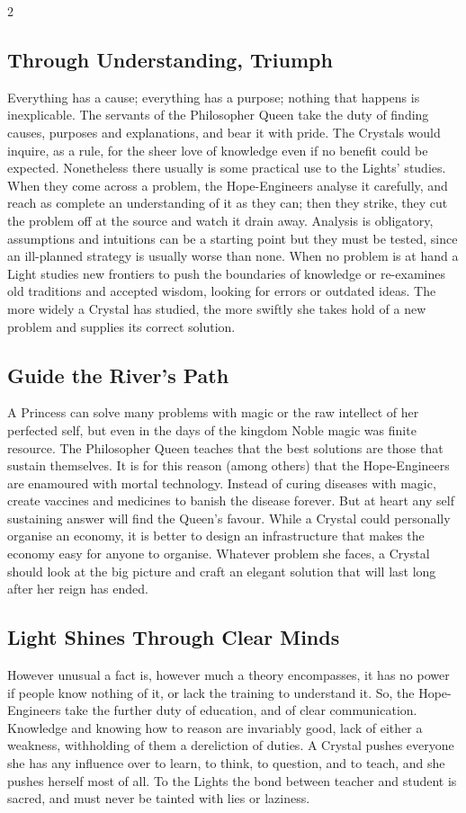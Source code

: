 \begin{multicols}{2}
\subsection*{Through Understanding, Triumph}
Everything has a cause; everything has a purpose; nothing that happens is inexplicable. The servants of the Philosopher Queen take the duty of finding causes, purposes and explanations, and bear it with pride. The Crystals would inquire, as a rule, for the sheer love of knowledge even if no benefit could be expected. Nonetheless there usually is some practical use to the Lights' studies. When they come across a problem, the Hope-Engineers analyse it carefully, and reach as complete an understanding of it as they can; then they strike, they cut the problem off at the source and watch it drain away. Analysis is obligatory, assumptions and intuitions can be a starting point but they must be tested, since an ill-planned strategy is usually worse than none. When no problem is at hand a Light studies new frontiers to push the boundaries of knowledge or re-examines old traditions and accepted wisdom, looking for errors or outdated ideas. The more widely a Crystal has studied, the more swiftly she takes hold of a new 
problem and supplies its correct solution.

\subsection*{Guide the River's Path}
A Princess can solve many problems with magic or the raw intellect of her perfected self, but even in the days of the kingdom Noble magic was finite resource. The Philosopher Queen teaches that the best solutions are those that sustain themselves. It is for this reason (among others) that the Hope-Engineers are enamoured with mortal technology. Instead of curing diseases with magic, create vaccines and medicines to banish the disease forever. But at heart any self sustaining answer will find the Queen's favour. While a Crystal could personally organise an economy, it is better to design an infrastructure that makes the economy easy for anyone to organise. Whatever problem she faces, a Crystal should look at the big picture and craft an elegant solution that will last long after her reign has ended.

\subsection*{Light Shines Through Clear Minds}
However unusual a fact is, however much a theory encompasses, it has no power if people know nothing of it, or lack the training to understand it. So, the Hope-Engineers take the further duty of education, and of clear communication. Knowledge and knowing how to reason are invariably good, lack of either a weakness, withholding of them a dereliction of duties. A Crystal pushes everyone she has any influence over to learn, to think, to question, and to teach, and she pushes herself most of all. To the Lights the bond between teacher and student is sacred, and must never be tainted with lies or laziness. 


\end{multicols}
